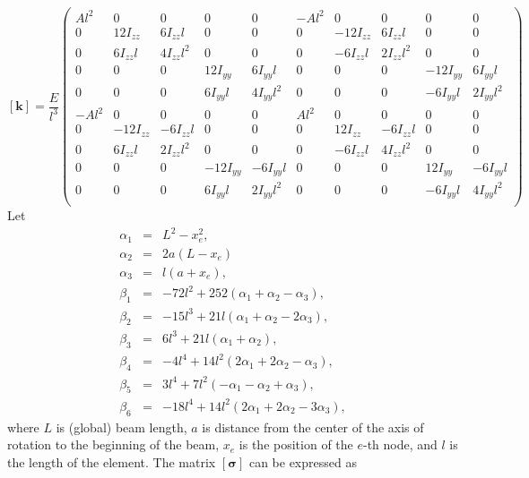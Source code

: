 \[
\mathbf{[k]} = 
\frac{E}{l^3}\begin{pmatrix}
  Al^2 &  0 &    0 &  0 &    0 & -Al^2 &   0 &    0 &   0 &    0\\
 0 &  12I_{zz} &   6I_{zz}l &  0 &    0 & 0 &  -12I_{zz} &   6I_{zz}l &   0 &    0\\
 0 & 6I_{zz}l & 4I_{zz}l^2 &  0 &    0 & 0 & -6I_{zz}l & 2I_{zz}l^2 &   0 &    0\\
 0 &  0 &    0 &  12I_{yy} &   6I_{yy}l & 0 &   0 &    0 &  -12I_{yy} &   6I_{yy}l\\
 0 &  0 &    0 & 6I_{yy}l & 4I_{yy}l^2 & 0 &   0 &    0 & -6I_{yy}l & 2I_{yy}l^2\\
 -Al^2 &  0 &    0 &  0 &    0 &  Al^2 &   0 &    0 &   0 &    0\\
 0 & -12I_{zz} &  -6I_{zz}l &  0 &    0 & 0 &   12I_{zz} &  -6I_{zz}l &   0 &    0\\
 0 & 6I_{zz}l & 2I_{zz}l^2 &  0 &    0 & 0 & -6I_{zz}l & 4I_{zz}l^2 &   0 &    0\\
 0 &  0 &    0 & -12I_{yy} &  -6I_{yy}l & 0 &   0 &    0 &   12I_{yy} &  -6I_{yy}l\\
 0 &  0 &    0 & 6I_{yy}l & 2I_{yy}l^2 & 0 &   0 &    0 & -6I_{yy}l & 4I_{yy}l^2\\
\end{pmatrix}
\]
Let 
\begin{eqnarray*}
\alpha_1 &=& L^2-x_e^2,\\
\alpha_2 &=& 2a(L-x_e)\\
\alpha_3 &=& l(a+x_e),\\
\beta_1 &=& -72l^2+252(\alpha_1+\alpha_2-\alpha_3),\\
\beta_2 &=& -15l^3+21l(\alpha_1+\alpha_2-2\alpha_3),\\
\beta_3 &=& 6l^3+21l(\alpha_1+\alpha_2),\\
\beta_4 &=& -4l^4+14l^2(2\alpha_1+2\alpha_2-\alpha_3),\\
\beta_5 &=& 3l^4+7l^2(-\alpha_1-\alpha_2+\alpha_3),\\
\beta_6 &=& -18l^4+14l^2(2\alpha_1+2\alpha_2-3\alpha_3),
\end{eqnarray*}
where $L$ is (global) beam length, $a$ is distance from the center of the axis of rotation to the beginning of the beam, $x_e$ is the position of the $e$-th node, and $l$ is the length of the element.
The matrix $\mathbf{[\sigma]}$ can be expressed as
